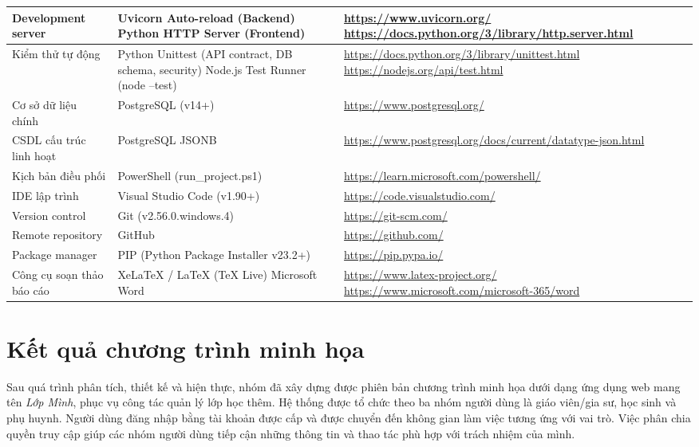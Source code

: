 \begin{longtable}{|>{\raggedright\arraybackslash}p{3.4cm}|>{\raggedright\arraybackslash}p{5.2cm}|>{\raggedright\arraybackslash}p{6.6cm}|}
    Development server & Uvicorn Auto-reload (Backend) \newline Python HTTP Server (Frontend) & \url{https://www.uvicorn.org/} \newline \url{https://docs.python.org/3/library/http.server.html} \\ \hline
    Kiểm thử tự động & Python Unittest (API contract, DB schema, security) \newline Node.js Test Runner (node --test) & \url{https://docs.python.org/3/library/unittest.html} \newline \url{https://nodejs.org/api/test.html} \\ \hline
    Cơ sở dữ liệu chính & PostgreSQL (v14+) & \url{https://www.postgresql.org/} \\ \hline
    CSDL cấu trúc linh hoạt & PostgreSQL JSONB & \url{https://www.postgresql.org/docs/current/datatype-json.html} \\ \hline
    Kịch bản điều phối & PowerShell (run\_project.ps1) & \url{https://learn.microsoft.com/powershell/} \\ \hline
    IDE lập trình & Visual Studio Code (v1.90+) & \url{https://code.visualstudio.com/} \\ \hline
    Version control & Git (v2.56.0.windows.4) & \url{https://git-scm.com/} \\ \hline
    Remote repository & GitHub & \url{https://github.com/} \\ \hline
    Package manager & PIP (Python Package Installer v23.2+) & \url{https://pip.pypa.io/} \\ \hline
    Công cụ soạn thảo báo cáo & XeLaTeX / LaTeX (TeX Live) \newline Microsoft Word & \url{https://www.latex-project.org/} \newline \url{https://www.microsoft.com/microsoft-365/word} \\ \hline
\end{longtable}

\section{Kết quả chương trình minh họa}
Sau quá trình phân tích, thiết kế và hiện thực, nhóm đã xây dựng được phiên bản chương trình minh họa dưới dạng ứng dụng web mang tên \textit{Lớp Mình}, phục vụ công tác quản lý lớp học thêm. Hệ thống được tổ chức theo ba nhóm người dùng là giáo viên/gia sư, học sinh và phụ huynh. Người dùng đăng nhập bằng tài khoản được cấp và được chuyển đến không gian làm việc tương ứng với vai trò. Việc phân chia quyền truy cập giúp các nhóm người dùng tiếp cận những thông tin và thao tác phù hợp với trách nhiệm của mình.


